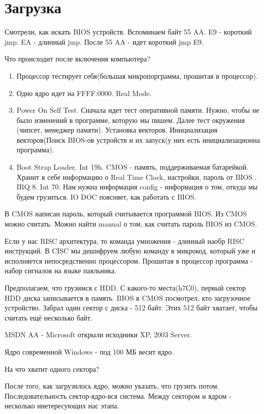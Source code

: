 \section{Загрузка}
Смотрели, как искать BIOS устройств. Вспоминаем байт 55 AA. E9 - короткий jmp. EA - длинный jmp. После 55 AA - идет короткий jmp E9. 

Что происходит после включения компьютера? 
\begin{enumerate}
\item Процессор тестирует себя(большая микропорграмма, прошитая в процессор). 
\item Одно ядро идет на FFFF:0000. Real Mode.
\item Power On Self Test. Сначала идет тест оперативной памяти. Нужно, чтобы не было изменений в программе, которую мы пишем. Далее тест окружения (чипсет, менеджер памяти).  Установка векторов. Инициализация векторов(Поиск BIOS-ов устройств и их запуск(у них есть инициализационна программа).
\item Boot Strap Loader. Int 19h. CMOS - память, поддерживаемая батарейкой. Хранит в себе информацию о Real Time Clock, настройки, пароль от BIOS . IRQ 8. Int 70. Нам нужна информация config - информация о том, откуда мы будем грузиться. IO DOC поясняет, как работать с BIOS.  
\end{enumerate}

В CMOS написан пароль, который считывается программой BIOS. Из CMOS можно считать. Можно найти manual о том, как считать пароль BIOS из CMOS.

Если у нас RISC архитектура, то команда умножения - длинный наобр RISC инструкций. В CISC мы дешифруем любую команду в микрокод, который уже и исполняется непосредственно процессором.
Прошитая в процессор программа - набор сигналов на языке паяльника. 

Предполагаем, что грузимся с HDD.
С какого-то места(h7С0), первый сектор HDD диска записывается в память. BIOS в CMOS посмотрел, кто загрузочное устройство. Забрал один сектор с диска - 512 байт. Этих 512 байт хватает, чтобы считать ещё несколько байт.

MSDN AA - Microsoft открыли исходники XP, 2003 Server. 

Ядро современной Windows - под 100 МБ весит ядро.
\begin{hw}На что хватит одного сектора?\end{hw}
После того, как загрузилось ядро, можно указать, что грузить потом. Последовательность сектор-ядро-вся система. Между сектором и ядром - несколько инетересующих нас этапа.

